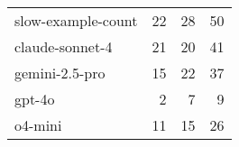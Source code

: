 \begin{tabular}{lrrr}
\toprule
\midrule
slow-example-count & 22 & 28 & 50 \\
claude-sonnet-4 & 21 & 20 & 41 \\
gemini-2.5-pro & 15 & 22 & 37 \\
gpt-4o & 2 & 7 & 9 \\
o4-mini & 11 & 15 & 26 \\
\bottomrule
\end{tabular}
